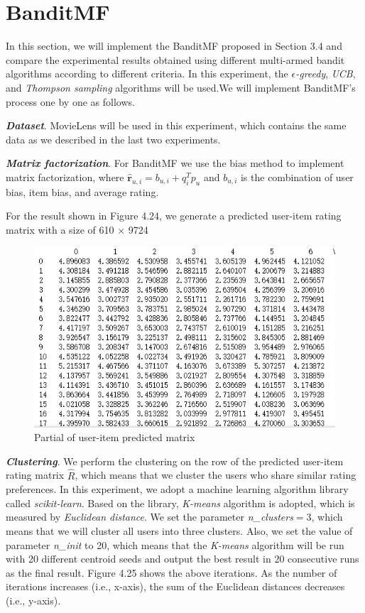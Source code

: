 \section{BanditMF}
In this section, we will implement the BanditMF proposed in Section 3.4 and compare the experimental results obtained using different multi-armed bandit algorithms according to different criteria. In this experiment, the \textit{$\epsilon$-greedy}, \textit{UCB}, and \textit{Thompson sampling} algorithms will be used.We will implement BanditMF's process one by one as follows.

\textbf{\textit{Dataset}}. MovieLens will be used in this experiment, which contains the same data as we described in the last two experiments.

\textbf{\textit{Matrix factorization}}.  For BanditMF we use the bias method to implement matrix factorization, where $\hat{\boldsymbol{r}}_{u,i}=b_{u,i}+q_{i}^{T} p_{u}$ and $b_{u,i}$ is the combination of user bias, item bias, and average rating.

For the result shown in Figure 4.24, we generate a predicted user-item rating matrix with a size of 610 $\times$ 9724 
\begin{figure}[htbp]
    \centering
    \includegraphics[scale=0.8]{figure/ex1.png}
    \caption{Partial of user-item predicted matrix }
\end{figure}

\textbf{\textit{Clustering}}. We perform the clustering on the row of the predicted user-item rating matrix $\hat{R}$, which means that we cluster the users who share similar rating preferences. In this experiment, we adopt a machine learning algorithm library called \textit{scikit-learn}. Based on the library, \textit{K-means} algorithm is adopted, which is measured by \textit{Euclidean distance}. We set the parameter \textit{n\_clusters}$=$3, which means that we will cluster all users into three clusters. Also, we set the value of parameter \textit{n\_init} to 20, which means that the \textit{K-means} algorithm will be run with 20 different centroid seeds and output the best result in 20 consecutive runs as the final result. Figure 4.25 shows the above iterations. As the number of iterations increases (i.e., x-axis), the sum of the Euclidean distances decreases (i.e., y-axis).

